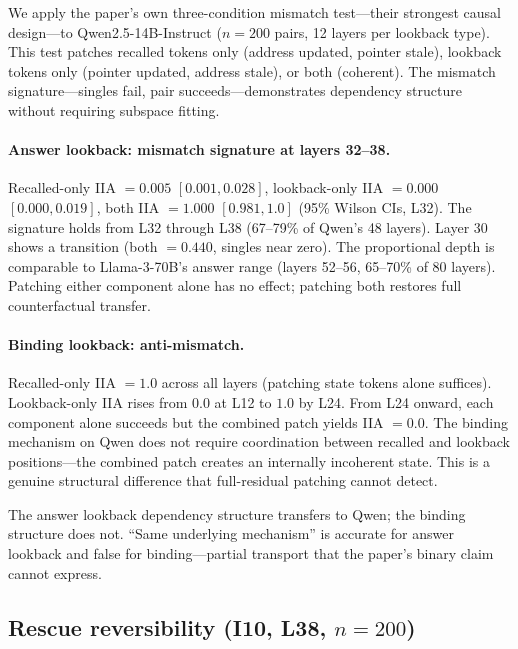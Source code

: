\documentclass{article}
\begin{document}
We apply the paper's own three-condition mismatch test---their strongest causal design---to Qwen2.5-14B-Instruct ($n = 200$ pairs, 12 layers per lookback type). This test patches recalled tokens only (address updated, pointer stale), lookback tokens only (pointer updated, address stale), or both (coherent). The mismatch signature---singles fail, pair succeeds---demonstrates dependency structure without requiring subspace fitting.

\paragraph{Answer lookback: mismatch signature at layers 32--38.}
Recalled-only IIA $= 0.005$ $[0.001, 0.028]$, lookback-only IIA $= 0.000$ $[0.000, 0.019]$, both IIA $= 1.000$ $[0.981, 1.0]$ (95\% Wilson CIs, L32). The signature holds from L32 through L38 (67--79\% of Qwen's 48 layers). Layer 30 shows a transition (both $= 0.440$, singles near zero). The proportional depth is comparable to Llama-3-70B's answer range (layers 52--56, 65--70\% of 80 layers). Patching either component alone has no effect; patching both restores full counterfactual transfer.

\paragraph{Binding lookback: anti-mismatch.}
Recalled-only IIA $= 1.0$ across all layers (patching state tokens alone suffices). Lookback-only IIA rises from $0.0$ at L12 to $1.0$ by L24. From L24 onward, each component alone succeeds but the combined patch yields IIA $= 0.0$. The binding mechanism on Qwen does not require coordination between recalled and lookback positions---the combined patch creates an internally incoherent state. This is a genuine structural difference that full-residual patching cannot detect.

The answer lookback dependency structure transfers to Qwen; the binding structure does not. ``Same underlying mechanism'' is accurate for answer lookback and false for binding---partial transport that the paper's binary claim cannot express.

\subsection{Rescue reversibility (I10, L38, $n = 200$)}
\end{document}
